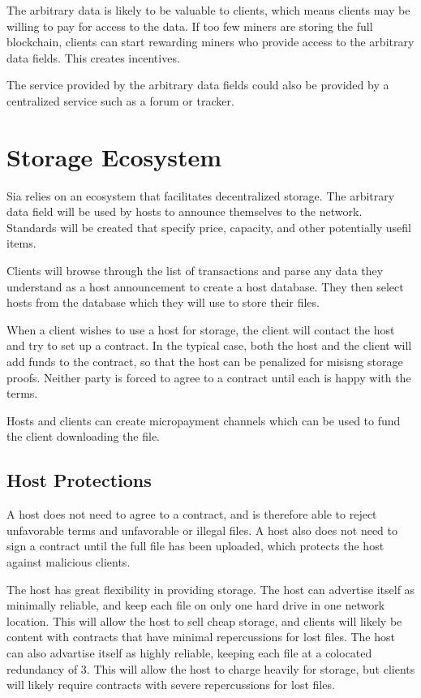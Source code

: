 \documentclass[twocolumn]{article}
\begin{document}
The arbitrary data is likely to be valuable to clients, which means clients may be willing to pay for access to the data.
If too few miners are storing the full blockchain, clients can start rewarding miners who provide access to the arbitrary data fields.
This creates incentives.

The service provided by the arbitrary data fields could also be provided by a centralized service such as a forum or tracker.

\section{Storage Ecosystem}
Sia relies on an ecosystem that facilitates decentralized storage.
The arbitrary data field will be used by hosts to announce themselves to the network.
Standards will be created that specify price, capacity, and other potentially usefil items.

Clients will browse through the list of transactions and parse any data they understand as a host announcement to create a host database.
They then select hosts from the database which they will use to store their files.

When a client wishes to use a host for storage, the client will contact the host and try to set up a contract.
In the typical case, both the host and the client will add funds to the contract, so that the host can be penalized for misisng storage proofs.
Neither party is forced to agree to a contract until each is happy with the terms.

Hosts and clients can create micropayment channels \cite{mpc} which can be used to fund the client downloading the file.

\subsection{Host Protections}
A host does not need to agree to a contract, and is therefore able to reject unfavorable terms and unfavorable or illegal files.
A host also does not need to sign a contract until the full file has been uploaded, which protects the host against malicious clients.

The host has great flexibility in providing storage.
The host can advertise itself as minimally reliable, and keep each file on only one hard drive in one network location.
This will allow the host to sell cheap storage, and clients will likely be content with contracts that have minimal repercussions for lost files.
The host can also advartise itself as highly reliable, keeping each file at a colocated redundancy of 3.
This will allow the host to charge heavily for storage, but clients will likely require contracts with severe repercussions for lost files.
\end{document}
